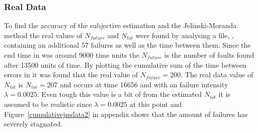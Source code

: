 \subsubsection*{Real Data}
\label{realdatajm}
To find the accuracy of the subjective estimation and the Jelinski-Moranda method the real values of $N_{future}$ and $N_{tot}$ were found by analysing a file, , containing an additional 57 failures as well as the time between them. Since the end time in  was around 9000 time units the $N_{future}$ is the number of faults found after 13500 units of time. By plotting the cumulative sum of the time between errors in  it was found that the real value of $N_{future}=200$. The real data value of $N_{tot}$ is $N_{tot}=207$ and occurs at time 16656 and with an failure intensity $\lambda=0.0025$. Even tough this value is a bit of from the estimated $N_{tot}$ it is assumed to be realistic since $\lambda=0.0025$ at this point and Figure~\ref{cumulativejmdata2} in appendix shows that the amount of failures has severely stagnated.